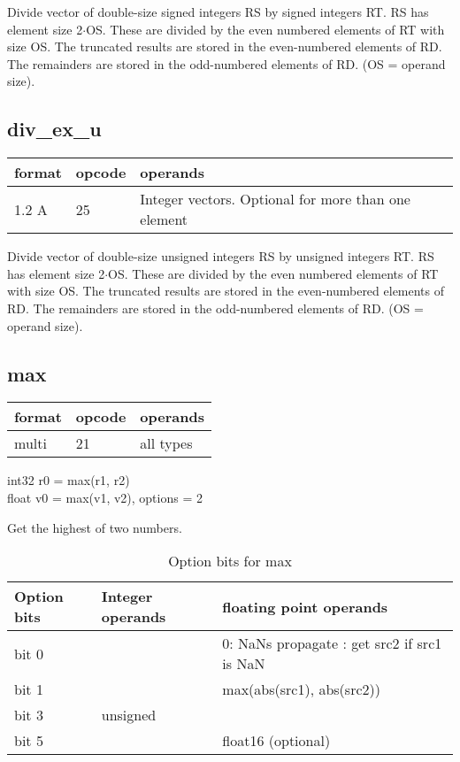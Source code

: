 \documentclass[forwardcom.tex]{subfiles}
\begin{document}
Divide vector of double-size signed integers RS by signed integers RT. RS has element size 2$\cdot$OS. These are divided by the even numbered
elements of RT with size OS. The truncated results are stored in the even-numbered elements of RD. The remainders are stored in the odd-numbered elements of RD.
(OS = operand size).
\vv


\subsection{div\_ex\_u}
\label{table:divExUInstruction}
\begin{tabular}{|p{12mm}|p{15mm}|p{100mm}|}
\hline
\bfseries format & \bfseries opcode & \bfseries operands \\ \hline
1.2 A & 25 & Integer vectors. Optional for more than one element \\ \hline
\end{tabular}
\vv

Divide vector of double-size unsigned integers RS by unsigned integers RT. RS has element size 2$\cdot$OS. These are divided by the even numbered elements of RT with size OS. The truncated results are stored in the even-numbered elements of RD. The remainders are stored in the odd-numbered elements of RD.
(OS = operand size).
\vv


\subsection{max}
\label{table:maxInstruction}
\begin{tabular}{|p{12mm}|p{15mm}|p{100mm}|}
\hline
\bfseries format & \bfseries opcode & \bfseries operands \\ \hline
multi & 21 & all types \\ \hline
\end{tabular}
\vv

int32 r0 = max(r1, r2) \\
float v0 = max(v1, v2), options = 2
\vv

Get the highest of two numbers.
\vv

\begin{longtable} {|p{16mm}|p{50mm}|p{50mm}|}
\caption{Option bits for max} 
\endfirsthead
\endhead
\hline
\bfseries Option bits & \bfseries Integer operands & \bfseries floating point operands   \\
\hline
bit 0 &  & 0: NaNs propagate \newline 1: get src2 if src1 is NaN \\
\hline
bit 1 &  & max(abs(src1), abs(src2)) \\
\hline
bit 3 & unsigned &  \\
\hline
bit 5 &  & float16 (optional) \\
\hline
\end{longtable}
\end{document}
